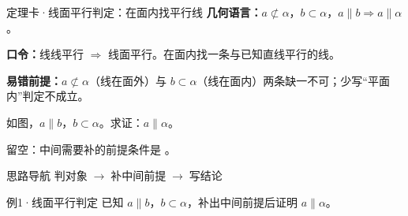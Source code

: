 \documentclass{exam-zh}
\begin{document}
\begin{eduSolutionBox}{定理卡·线面平行判定：在面内找平行线}
  \begingroup
  \setlength{\parskip}{2.5mm}
\textbf{几何语言：}$a\not\subset\alpha$，$b\subset\alpha$，$a\parallel b\Rightarrow a\parallel\alpha$。\par
\textbf{口令：}线线平行 $\Rightarrow$ 线面平行。在面内找一条与已知直线平行的线。\par
\textbf{易错前提：}$a\not\subset\alpha$（线在面外）与 $b\subset\alpha$（线在面内）两条缺一不可；少写“平面内”判定不成立。\par
  \endgroup
\end{eduSolutionBox}




\begin{eduProblemBlock}[例1·线面平行判定]
如图，$a\parallel b$，$b\subset\alpha$。求证：$a\parallel\alpha$。
\par\noindent 留空：中间需要补的前提条件是 \underline{\hspace{20mm}}。

\end{eduProblemBlock}





\begin{eduAuxItem}{思路导航}
判对象$\;\to\;$补中间前提$\;\to\;$写结论\end{eduAuxItem}




\begin{eduSubQuestionItem}{例1·线面平行判定}
已知 $a\parallel b$，$b\subset\alpha$，补出中间前提后证明 $a\parallel\alpha$。\end{eduSubQuestionItem}

\begin{eduDualExplain}
  \begin{eduExplainLeft}
  \end{eduExplainLeft}

  \begin{eduExplainRight}
  \end{eduExplainRight}
\end{eduDualExplain}
\end{document}

